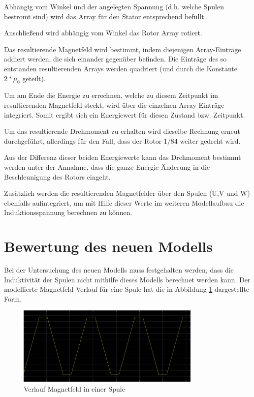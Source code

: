Abhängig vom Winkel und der angelegten Spannung (d.h. welche Spulen bestromt sind) wird das Array für den Stator entsprechend befüllt. 

Anschließend wird abhängig vom Winkel das Rotor Array rotiert. 

Das resultierende Magnetfeld wird bestimmt, indem diejenigen Array-Einträge addiert werden, die sich einander gegenüber befinden. 
Die Einträge des so entstanden resultierenden Arrays werden quadriert (und durch die Konstante $2*\mu_0$ geteilt). 

Um am Ende die Energie zu errechnen, welche zu diesem Zeitpunkt im resultierenden Magnetfeld steckt, wird über die einzelnen Array-Einträge integriert. 
Somit ergibt sich ein Energiewert für diesen Zustand bzw. Zeitpunkt. 

Um das resultierende Drehmoment zu erhalten wird dieselbe Rechnung erneut durchgeführt, allerdings für den Fall, dass der Rotor $1/84$ weiter gedreht wird. 

Aus der Differenz dieser beiden Energiewerte kann das Drehmoment bestimmt werden unter der Annahme, dass die ganze Energie-Änderung in die Beschleunigung des Rotors eingeht.

Zusätzlich werden die resultierenden Magnetfelder über den Spulen (U,V und W) ebenfalls aufintegriert, um mit Hilfe dieser Werte im weiteren Modellaufbau die Induktionsspannung berechnen zu können.

\section{Bewertung des neuen Modells}
Bei der Untersuchung des neuen Modells muss festgehalten werden, dass die Induktivität der Spulen nicht mithilfe dieses Modells berechnet werden kann. 
Der modellierte Magnetfeld-Verlauf für eine Spule hat die in Abbildung \ref{FigResultierendesFeld}
dargestellte Form.

\begin{figure}[htbp]
	\centering
	\includegraphics[width=0.8\textwidth]{./sim/pictures/resultierendesFeld.png}
	\caption{Verlauf Magnetfeld in einer Spule}
	\label{FigResultierendesFeld}
\end{figure}

